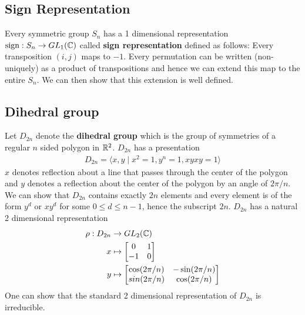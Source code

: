 \subsection{Sign Representation}
Every symmetric group $S_n$ has a 1 dimensional representation $\mathrm{sign}: S_n \rightarrow GL_1(\mathbb{C})$ called \textbf{sign representation} defined as follows: Every transposition $(i,j)$ maps to $-1$. Every permutation can be written (non-uniquely) as a product of transpositions and hence we can extend this map to the entire $S_n$. We can then show that this extension is well defined.


\subsection{Dihedral group}
Let $D_{2n}$ denote the \textbf{dihedral group} which is the group of symmetries of a regular $n$ sided polygon in $\mathbb{R}^2$. $D_{2n}$ has a presentation
\begin{align}
	D_{2n} = \langle x,y \mid x^2 = 1, y^n = 1, xyxy=1\rangle
\end{align}
$x$ denotes reflection about a line that passes through the center of the polygon and $y$ denotes a reflection about the center of the polygon by an angle of $2 \pi / n$. We can show that $D_{2n}$ contains exactly $2n$ elements and every element is of the form $y^d$ or $xy^d$ for some $0 \le d \le n - 1$, hence the subscript $2n$. $D_{2n}$ has a natural 2 dimensional representation
\begin{align}
	\rho : D_{2n} &\rightarrow GL_2(\mathbb{C}) \\
	x & \mapsto \begin{bmatrix} 0               & 1                \\ -1 & 0 \end{bmatrix} \\
	y & \mapsto \begin{bmatrix} \cos(2 \pi / n) & -\sin(2 \pi / n) \\ sin(2 \pi / n) & \cos(2 \pi / n) \end{bmatrix}
\end{align}
One can show that the standard 2 dimensional representation of $D_{2n}$ is irreducible.

